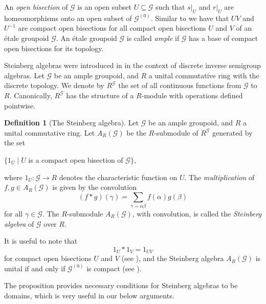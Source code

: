 \documentclass[a4paper, 11pt, reqno]{amsart}
\theoremstyle{definition}
\newtheorem{defn}[thm]{Definition}
\begin{document}
An \textit{open bisection} of $\mathcal{G}$ is an open subset $U\subseteq \mathcal{G}$ such that $s|_U$ and $r|_U$ are homeomorphisms onto an open subset of $\mathcal{G}^{(0)}$.  Similar to \cite[Proposition 2.2.4]{p:gisatoa} we have that $UV$ and $U^{-1}$ are compact open bisections for all compact open bisections $U$ and $V$ of an  \'{e}tale groupoid  $\mathcal{G}$.
An \'{e}tale groupoid $\mathcal{G}$ is called \textit{ample} if  $\mathcal{G}$ has a base of compact open bisections for its topology.

Steinberg algebras were introduced in \cite{stein:agatdisa} in the context of discrete inverse semigroup algebras. Let $\mathcal{G}$ be an ample groupoid, and $R$ a unital commutative ring with the discrete topology. We denote by $R^{\mathcal{G}}$ the set of all continuous functions from $\mathcal{G}$ to $R$. Canonically,  $R^{\mathcal{G}}$ has the structure of a $R$-module with
operations defined pointwise.

\begin{defn}[{The Steinberg algebra}] 
	Let $\mathcal{G}$ be an ample groupoid, and  $R$ a unital commutative ring.  Let $A_R(\mathcal{G})$ be the $R$-submodule of $R^{\mathcal{G}}$ generated by the set
	\begin{center}
		$\{1_U\mid U$ is a compact open bisection of $\mathcal{G}\}$,
	\end{center}
	where $1_U: \mathcal{G}\longrightarrow R$ denotes the characteristic function on $U$. The \textit{multiplication} of $f, g\in A_R(\mathcal{G})$ is given by the convolution
	\[(f\ast g)(\gamma)= \sum_{\gamma = \alpha\beta}f(\alpha)g(\beta)\] for all $\gamma\in \mathcal{G}$. The $R$-submodule $A_R(\mathcal{G})$, with convolution, is called the \textit{Steinberg algebra} of $\mathcal{G}$ over $R$.
\end{defn}

It is useful to note that \[1_U\ast 1_V = 1_{UV}\] for compact open bisections $U$ and $V$ (see \cite[Proposition 4.5]{stein:agatdisa}), and the Steinberg algebra $A_R(\mathcal{G})$ is unital if and only if $\mathcal{G}^{(0)}$ is compact (see \cite[Proposition 4.11]{stein:agatdisa}).

The proposition provides necessary conditions for Steinberg algebras to be domains, which is very useful in our below arguments.
\end{document}
